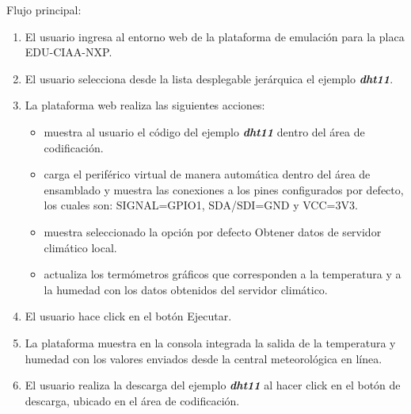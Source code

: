 Flujo principal:
\begin{enumerate}
	\item El usuario ingresa al entorno web de la plataforma de emulación para la placa EDU-CIAA-NXP.
	\item El usuario selecciona desde la lista desplegable jerárquica el ejemplo \textit{\textbf{dht11}}.
	\item La plataforma web realiza las siguientes acciones:
	 
	\begin{itemize}
	    \item muestra al usuario el código  del ejemplo \textit{\textbf{dht11}} dentro del área de codificación.
	    \item carga el periférico virtual de manera automática dentro del área de ensamblado y muestra las conexiones a los pines configurados por defecto, los cuales son: \textquotedbl SIGNAL=GPIO1\textquotedbl, \textquotedbl SDA/SDI=GND\textquotedbl{} y \textquotedbl VCC=3V3\textquotedbl.
	    \item muestra seleccionado la opción por defecto \textquotedbl Obtener datos de servidor climático local.\textquotedbl
	    \item actualiza los termómetros gráficos que corresponden a la temperatura y a la humedad con los datos obtenidos del servidor climático.
	\end{itemize}

	\item El usuario hace click en el botón \textquotedbl Ejecutar\textquotedbl.
	\item La plataforma muestra en la consola integrada la salida de la temperatura y humedad con los valores enviados desde la central meteorológica en línea.
	\item El usuario realiza la descarga del ejemplo \textit{\textbf{dht11}} al hacer click en el botón de descarga, ubicado en el área de codificación.
\end{enumerate}

